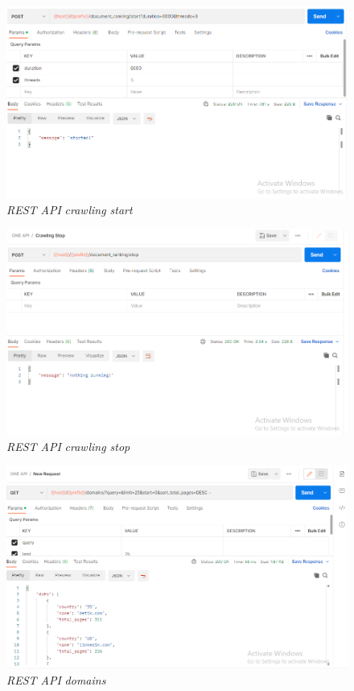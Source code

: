 \begin{enumerate}[label=\alph*)., leftmargin=1\parindent]
	
	\begin{figure}[H]
		\centering
		\includegraphics[keepaspectratio, width=13cm]{gambar/rest_api_crawling_start.png}
		\caption{\textit{REST API} \textit{crawling start}}
		\label{gambar:rest_api_crawling_start.png}
	\end{figure}


	\begin{figure}[H]
		\centering
		\includegraphics[keepaspectratio, width=13cm]{gambar/rest_api_crawling_stop.png}
		\caption{\textit{REST API} \textit{crawling stop}}
		\label{gambar:rest_api_crawling_stop.png}
	\end{figure}
	
	
	\begin{figure}[H]
		\centering
		\includegraphics[keepaspectratio, width=13cm]{gambar/rest_domains.png}
		\caption{\textit{REST API} \textit{domains}}
		\label{gambar:rest_domains.png}
	\end{figure}



\end{enumerate}
